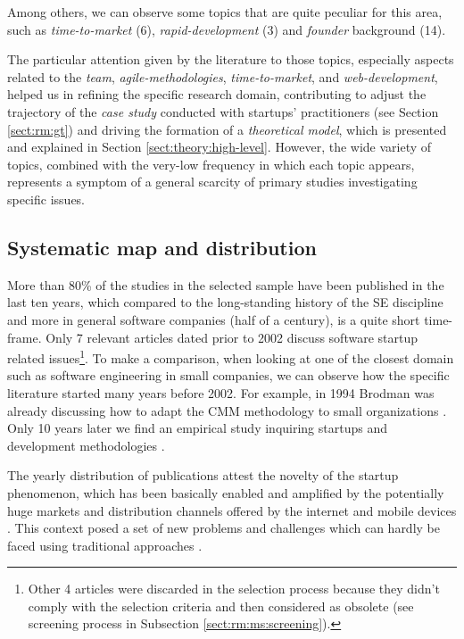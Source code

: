 \documentclass[final,5p,times,twocolumn]{elsarticle}
\begin{document}
Among others, we can observe some topics that are quite peculiar for this area, such as \textit{time-to-market} (6), \textit{rapid-development} (3) and \textit{founder} background (14).

The particular attention given by the literature to those topics, especially aspects related to the   \textit{team},  \textit{agile-methodologies}, \textit{time-to-market},  and  \textit{web-development}, helped us in refining the specific research domain, contributing to adjust the trajectory  of the \textit{case study} conducted with startups' practitioners (see Section \ref{sect:rm:gt}) and driving the formation of a \textit{theoretical model}, which is presented and explained in Section \ref{sect:theory:high-level}. However, the wide variety of topics, combined with the very-low frequency in which each topic appears, represents a symptom of a general scarcity of primary studies investigating specific issues.

\subsection{Systematic map and distribution}

More than 80\% of the studies in the selected sample have been published in the last ten years, which compared to the long-standing history of the SE discipline and more in general software companies (half of a century), is a quite short time-frame. Only 7 relevant articles dated prior to 2002 discuss software startup related issues\footnote{Other 4 articles were discarded in the selection process because they didn’t comply with the selection criteria and then considered as obsolete (see screening process in Subsection \ref{sect:rm:ms:screening}).}. To make a comparison, when looking at one of the closest domain such as software engineering in small companies, we can observe how the specific literature started many years before 2002. For example, in 1994 Brodman was already discussing how to adapt the CMM methodology to small organizations \cite{Brodman1994}. Only 10 years later we find an empirical study inquiring startups and development methodologies \cite{Silva2005}.

The yearly distribution of publications attest the novelty of the startup phenomenon, which has been basically enabled and amplified by the potentially huge markets and distribution channels offered by the internet and mobile devices \cite{Christensen1997,Kakati2003}. This context posed a set of new problems and challenges which can hardly be faced using traditional approaches \cite{Sutton2000}.
\end{document}
